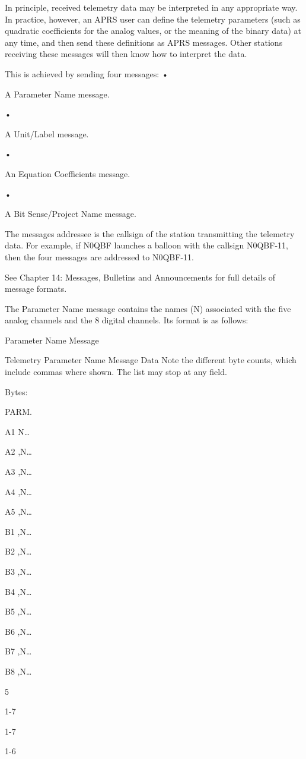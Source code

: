 In principle, received telemetry data may be interpreted in any appropriate
way. In practice, however, an APRS user can define the telemetry parameters
(such as quadratic coefficients for the analog values, or the meaning of the
binary data) at any time, and then send these definitions as APRS messages.
Other stations receiving these messages will then know how to interpret the
data.

This is achieved by sending four messages:
•

A Parameter Name message.

•

A Unit/Label message.

•

An Equation Coefficients message.

•

A Bit Sense/Project Name message.

The messages addressee is the callsign of the station transmitting the
telemetry data. For example, if N0QBF launches a balloon with the callsign
N0QBF-11, then the four messages are addressed to N0QBF-11.

See Chapter 14: Messages, Bulletins and Announcements for full details of
message formats.

The Parameter Name message contains the names (N) associated with the
five analog channels and the 8 digital channels. Its format is as follows:

Parameter Name
Message

Telemetry Parameter Name Message Data
Note the different byte counts, which include commas where shown. The list may stop at any field.

Bytes:

PARM.

A1
N…

A2
,N…

A3
,N…

A4
,N…

A5
,N…

B1
,N…

B2
,N…

B3
,N…

B4
,N…

B5
,N…

B6
,N…

B7
,N…

B8
,N…

5

1-7

1-7

1-6

